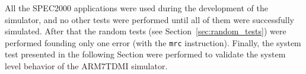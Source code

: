 All the SPEC2000 applications were used during the development of the simulator, and no other tests were performed until all of them were successfully simulated.
After that the random tests (see Section~\ref{sec:random_tests}) were performed founding only one error (with the \texttt{mrc} instruction).
Finally, the system test presented in the following Section were performed to validate the system level behavior of the ARM7TDMI simulator.
